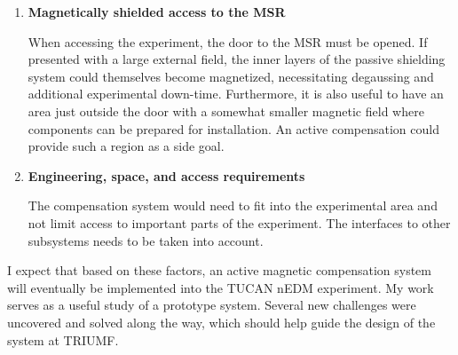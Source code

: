 \begin{enumerate}
    \item {\bf Magnetically shielded access to the MSR} 
    
    When accessing the experiment, the door to the MSR must be opened. If presented with a large external field, the inner layers of the passive shielding system could themselves become magnetized, necessitating degaussing and additional experimental down-time.  Furthermore, it is also useful to have an area just outside the door with a somewhat smaller magnetic field where components can be prepared for installation.  An active compensation could provide such a region as a side goal.

    \item {\bf Engineering, space, and access requirements} 
    
    The compensation system would need to fit into the experimental area and not limit access to important parts of the experiment.  The interfaces to other subsystems needs to be taken into account.
\end{enumerate}

 I expect that based on these factors, an active magnetic compensation system will eventually be implemented into the TUCAN nEDM experiment. My work serves as a useful study of a prototype system. Several new challenges were uncovered and solved along the way, which should help guide the design of the system at TRIUMF.
 





